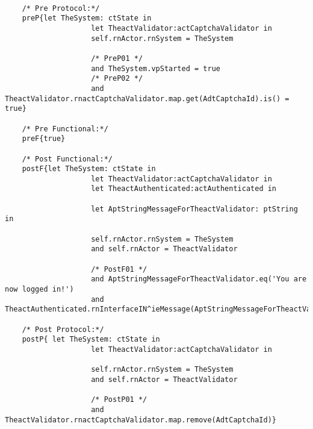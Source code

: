 	\scriptsize
	\vspace{0.5cm}
	\begin{lstlisting}[style=MessirStyle,firstnumber=auto,captionpos=b,caption={\msrmessir (MCL-oriented) specification of the operation \emph{oeCaptchaValid}.},label=OM-actCaptchaValidator-oeCaptchaValid-MCL-LST]

	/* Pre Protocol:*/ 
	preP{let TheSystem: ctState in
	  				let TheactValidator:actCaptchaValidator in
					self.rnActor.rnSystem = TheSystem
	  
					/* PreP01 */
					and TheSystem.vpStarted = true
					/* PreP02 */
					and TheactValidator.rnactCaptchaValidator.map.get(AdtCaptchaId).is() = true}
	
	/* Pre Functional:*/
	preF{true}
	
	/* Post Functional:*/ 
	postF{let TheSystem: ctState in
					let TheactValidator:actCaptchaValidator in
					let TheactAuthenticated:actAuthenticated in
					
					let AptStringMessageForTheactValidator: ptString in
					  
					self.rnActor.rnSystem = TheSystem
					and self.rnActor = TheactValidator
					
					/* PostF01 */
					and AptStringMessageForTheactValidator.eq('You are now logged in!')
					and TheactAuthenticated.rnInterfaceIN^ieMessage(AptStringMessageForTheactValidator)}
	
	/* Post Protocol:*/ 
	postP{ let TheSystem: ctState in
				  	let TheactValidator:actCaptchaValidator in
				  
				  	self.rnActor.rnSystem = TheSystem
				  	and self.rnActor = TheactValidator
				  	
				  	/* PostP01 */
					and TheactValidator.rnactCaptchaValidator.map.remove(AdtCaptchaId)}
	
	\end{lstlisting}
	\normalsize 
	
	
	
	





